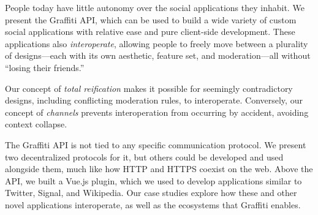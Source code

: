 



People today have little autonomy over the social applications
they inhabit.
We present the Graffiti API, which can be used
to build a wide variety of custom social applications with
relative ease and pure client-side development. These applications
also \emph{interoperate}, allowing people to freely move between
a plurality of designs---each with its own aesthetic, feature set,
and moderation---all without ``losing their friends.''

Our concept of \emph{total reification} makes it possible
for seemingly contradictory designs, including conflicting
moderation rules, to interoperate.
Conversely, our concept of \emph{channels}
prevents interoperation from occurring by accident, avoiding context collapse.

The Graffiti API is not tied to any specific communication protocol.
We present two decentralized protocols for it,
but others could be developed and used alongside them,
much like how HTTP and HTTPS coexist on the web.
Above the API, we built a Vue.js plugin, which we used
to develop applications similar to Twitter, Signal, and Wikipedia.
Our case studies explore how these and other novel applications interoperate,
as well as the ecosystems that Graffiti enables.
